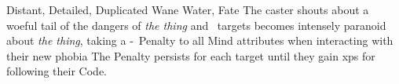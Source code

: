   {Distant, Detailed, Duplicated}%
  {Wane}%
  {Water, Fate}%
  {}%
  {The caster shouts about a woeful tail of the dangers of \emph{the thing} and ~targets becomes intensely paranoid about \emph{the thing}, taking a -~Penalty to all Mind \glspl{attribute} when interacting with their new phobia}%
  {
  The Penalty persists for each target until they gain  \glspl{xp} for following their Code.}

